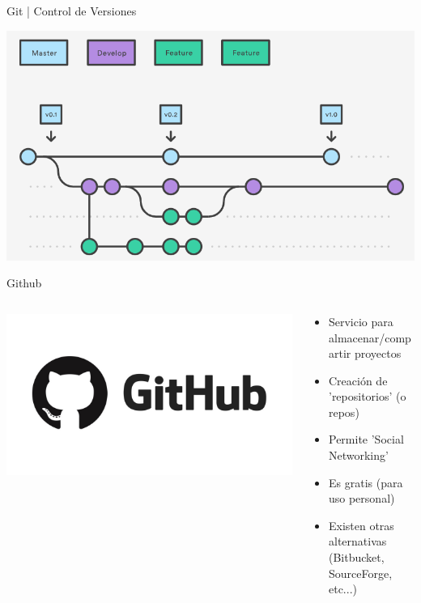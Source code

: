 \documentclass{beamer}
\begin{document}
\begin{frame}{Git | Control de Versiones}
	
	\includegraphics[scale=.35]{img/git_project.png}
	
\end{frame}

\begin{frame}{Github}
	\begin{columns}
		\begin{column}{.45\textwidth}
			\includegraphics[scale=.12]{img/github.jpeg}
		\end{column}
		\begin{column}{.6\textwidth}
			
			\begin{itemize}
				\item Servicio para almacenar/compartir proyectos
				\item Creación de 'repositorios' (o repos)
				\item Permite 'Social Networking'
				\item Es gratis (para uso personal)
				\item Existen otras alternativas (Bitbucket, SourceForge, etc...)
			\end{itemize}
		\end{column}
	\end{columns}
	
\end{frame}
\end{document}
